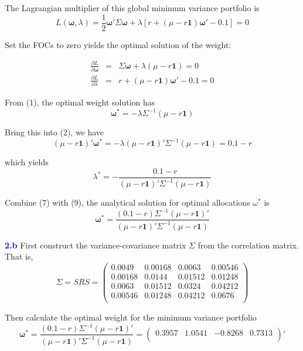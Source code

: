 \documentclass[a4paper,11pt] {article}
\begin{document}
The Lagrangian multiplier of this global minimum variance portfolio is
$$
L(\mathbf{\omega}, \lambda) = \frac{1}{2}\mathbf{\omega}'\Sigma\mathbf{\omega} + \lambda[r + (\mu-r\mathbf{1})\mathbf{\omega}' - 0.1] = 0
$$

Set the FOCs to zero yields the optimal solution of the weight:

\begin{eqnarray}
\frac{\partial L}{\partial \mathbf{\omega}} &=& \Sigma \mathbf{\omega} + \lambda (\mu-r\mathbf{1}) = 0 \\
\frac{\partial L}{\partial \lambda} &=& r + (\mu-r\mathbf{1})\mathbf{\omega}' - 0.1 = 0
\end{eqnarray}

From (1), the optimal weight solution has
\begin{equation}
\mathbf{\omega}^* = -\lambda \Sigma^{-1} (\mu-r\mathbf{1})
\end{equation}

Bring this into (2), we have
\begin{equation}
(\mu-r\mathbf{1})'\mathbf{\omega}^{*} = -\lambda (\mu-r\mathbf{1})'\Sigma^{-1}(\mu-r\mathbf{1}) = 0.1-r
\end{equation}

which yields
\begin{equation}
\lambda^* = -\frac{0.1-r}{(\mu-r\mathbf{1})'\Sigma^{-1}(\mu-r\mathbf{1})}
\end{equation}

Combine (7) with (9), the analytical solution for optimal allocations $\omega^*$ is
$$
\mathbf{\omega}^* = \frac{(0.1-r)\Sigma^{-1}(\mu-r\mathbf{1})'}{(\mu-r\mathbf{1})'\Sigma^{-1}(\mu-r\mathbf{1})}
$$

\textcolor{blue}{\bf 2.b } First construct the variance-covariance matrix $\Sigma$ from the correlation matrix. That is, 
$$
\Sigma = SRS = 
\left(
  \begin{array}{cccc}
0.0049	&	0.00168	&	0.0063	&	0.00546	\\
0.00168	&	0.0144	&	0.01512	&	0.01248	\\
0.0063	&	0.01512	&	0.0324	&	0.04212	\\
0.00546	&	0.01248	&	0.04212	&	0.0676	\\
  \end{array}
\right)
$$

Then calculate the optimal weight for the minimum variance portfolio
$$
\mathbf{\omega}^* = \frac{(0.1-r)\Sigma^{-1}(\mu-r\mathbf{1})'}{(\mu-r\mathbf{1})'\Sigma^{-1}(\mu-r\mathbf{1})} = 
\left(
  \begin{array}{cccc}
    0.3957 & 1.0541 & -0.8268 & 0.7313 \\
  \end{array}
\right)'
$$
\end{document}
